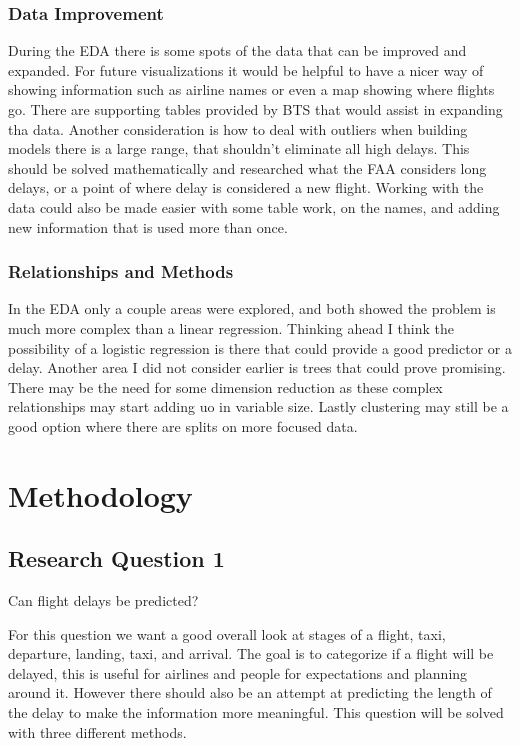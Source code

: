\documentclass[a4paper,12pt]{article}
\begin{document}
\subsubsection{Data Improvement}
During the EDA there is some spots of the data that can be improved and expanded. For future visualizations it would be helpful to have a nicer way of showing information
such as airline names or even a map showing where flights go. There are supporting tables provided by BTS that would assist in expanding tha data. Another consideration is how to deal with outliers when building models
there is a large range, that shouldn't eliminate all high delays. This should be solved mathematically and researched what the FAA considers long delays, or a point of where delay is considered a new flight. Working with the data 
could also be made easier with some table work, on the names, and adding new information that is used more than once.

\subsubsection{Relationships and Methods}
In the EDA only a couple areas were explored, and both showed the problem is much more complex than a linear regression. Thinking ahead I think the possibility of a logistic regression is there that could provide a good predictor or a delay.
Another area I did not consider earlier is trees that could prove promising. There may be the need for some dimension reduction as these complex relationships may start adding uo in variable size. Lastly clustering may still be a good option where there are splits on more focused data.

\section{Methodology}

\subsection{Research Question 1}
Can flight delays be predicted?

For this question we want a good overall look at stages of a flight, taxi, departure, landing, taxi, and arrival. The goal is to categorize if a flight will be delayed,
this is useful for airlines and people for expectations and planning around it. However there should also be an attempt at predicting the length of the delay to make 
the information more meaningful. This question will be solved with three different methods.
\end{document}
